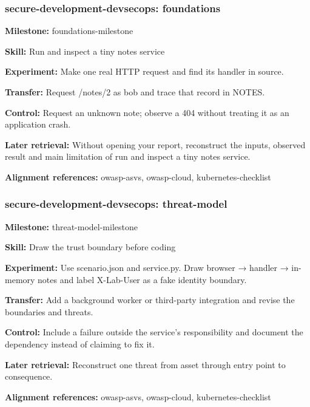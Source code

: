 \subsubsection{secure-development-devsecops: foundations}
\noindent\textbf{Milestone:} foundations-milestone\par
\noindent\textbf{Skill:} Run and inspect a tiny notes service\par
\noindent\textbf{Experiment:} Make one real HTTP request and find its handler in source.\par
\noindent\textbf{Transfer:} Request /notes/2 as bob and trace that record in NOTES.\par
\noindent\textbf{Control:} Request an unknown note; observe a 404 without treating it as an application crash.\par
\noindent\textbf{Later retrieval:} Without opening your report, reconstruct the inputs, observed result and main limitation of run and inspect a tiny notes service.\par
\noindent\textbf{Alignment references:} owasp-asvs, owasp-cloud, kubernetes-checklist\par
\subsubsection{secure-development-devsecops: threat-model}
\noindent\textbf{Milestone:} threat-model-milestone\par
\noindent\textbf{Skill:} Draw the trust boundary before coding\par
\noindent\textbf{Experiment:} Use scenario.json and service.py. Draw browser → handler → in-memory notes and label X-Lab-User as a fake identity boundary.\par
\noindent\textbf{Transfer:} Add a background worker or third-party integration and revise the boundaries and threats.\par
\noindent\textbf{Control:} Include a failure outside the service's responsibility and document the dependency instead of claiming to fix it.\par
\noindent\textbf{Later retrieval:} Reconstruct one threat from asset through entry point to consequence.\par
\noindent\textbf{Alignment references:} owasp-asvs, owasp-cloud, kubernetes-checklist\par
